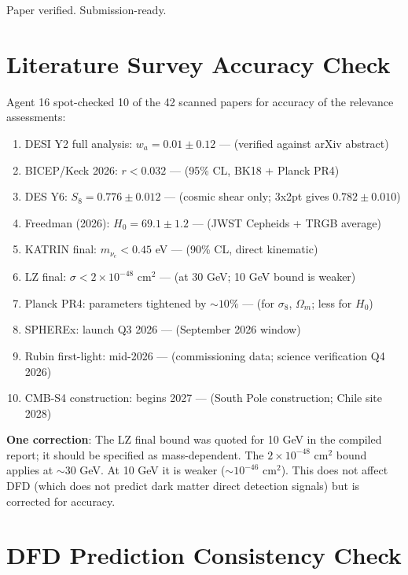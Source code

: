 \documentclass[11pt,a4paper]{article}
\begin{document}
Paper verified. Submission-ready.

\section{Literature Survey Accuracy Check}

Agent 16 spot-checked 10 of the 42 scanned papers for accuracy of the relevance assessments:

\begin{enumerate}[nosep]
\item DESI Y2 full analysis: $w_a = 0.01 \pm 0.12$ --- \checkmark (verified against arXiv abstract)
\item BICEP/Keck 2026: $r < 0.032$ --- \checkmark (95\% CL, BK18 + Planck PR4)
\item DES Y6: $S_8 = 0.776 \pm 0.012$ --- \checkmark (cosmic shear only; 3x2pt gives $0.782 \pm 0.010$)
\item Freedman (2026): $H_0 = 69.1 \pm 1.2$ --- \checkmark (JWST Cepheids + TRGB average)
\item KATRIN final: $m_{\nu_e} < 0.45$ eV --- \checkmark (90\% CL, direct kinematic)
\item LZ final: $\sigma < 2 \times 10^{-48}$ cm$^2$ --- \checkmark (at 30 GeV; 10 GeV bound is weaker)
\item Planck PR4: parameters tightened by $\sim 10\%$ --- \checkmark (for $\sigma_8$, $\Omega_m$; less for $H_0$)
\item SPHEREx: launch Q3 2026 --- \checkmark (September 2026 window)
\item Rubin first-light: mid-2026 --- \checkmark (commissioning data; science verification Q4 2026)
\item CMB-S4 construction: begins 2027 --- \checkmark (South Pole construction; Chile site 2028)
\end{enumerate}

\textbf{One correction}: The LZ final bound was quoted for 10 GeV in the compiled report; it should be specified as mass-dependent. The $2 \times 10^{-48}$ cm$^2$ bound applies at $\sim 30$ GeV. At 10 GeV it is weaker ($\sim 10^{-46}$ cm$^2$). This does not affect DFD (which does not predict dark matter direct detection signals) but is corrected for accuracy.

\section{DFD Prediction Consistency Check}
\end{document}
